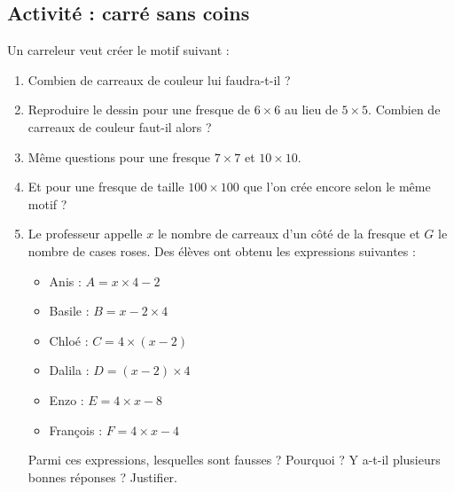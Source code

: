 
\subsection*{Activité : carré sans coins}

Un carreleur veut créer le motif suivant :
\begin{center}
   
\end{center}
\begin{enumerate}
    \item
Combien de carreaux de couleur lui faudra-t-il ? 
\item
Reproduire le dessin pour une fresque de \( 6\times 6\) au lieu de \( 5\times 5\). Combien de carreaux de couleur faut-il alors ? 
\item
    Même questions pour une fresque \( 7\times 7\) et \( 10\times 10\).
\item
Et pour une fresque de taille \( 100\times 100\) que l'on crée encore selon le même motif ?
\item
Le professeur appelle $x$ le nombre de carreaux d'un côté de la fresque et $G$ le nombre de cases roses. Des élèves ont obtenu les expressions suivantes :
\begin{multicols}{3}
    \begin{itemize}
        \item
            Anis : \( A=x\times 4-2\)
        \item
            Basile : \( B=x-2\times 4\)
        \item
            Chloé : \( C=4\times (x-2)\)
        \item
             Dalila : \( D=(x-2)\times 4 \)
         \item
             Enzo : \( E=4\times x-8\)
         \item
             François : \( F=4\times x-4\)
    \end{itemize}
\end{multicols}
Parmi ces expressions, lesquelles sont fausses ? Pourquoi ? Y a-t-il plusieurs bonnes réponses ? Justifier.
\end{enumerate}


